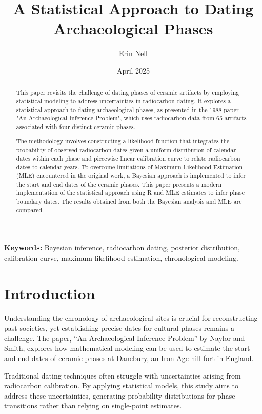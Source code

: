 \documentclass{article}
\title{A Statistical Approach to Dating Archaeological Phases}
\author{Erin Nell}
\date{April 2025}
\begin{document}
\maketitle

\begin{abstract}
This paper revisits the challenge of dating phases of ceramic artifacts by employing statistical modeling to address uncertainties in radiocarbon dating. It explores a statistical approach to dating archaeological phases, as presented in the 1988 paper "An Archaeological Inference Problem", which uses radiocarbon data from 65 artifacts associated with four distinct ceramic phases.

The methodology involves constructing a likelihood function that integrates the probability of observed radiocarbon dates given a uniform distribution of calendar dates within each phase and piecewise linear calibration curve to relate radiocarbon dates to calendar years. To overcome limitations of Maximum Likelihood Estimation (MLE) encountered in the original work, a Bayesian approach is implemented to infer the start and end dates of the ceramic phases. This paper presents a modern implementation of the statistical approach using R and MLE estimates to infer phase boundary dates. The results obtained from both the Bayesian analysis and MLE are compared. 




\end{abstract}

\noindent
\textbf{Keywords:} Bayesian inference, radiocarbon dating, posterior distribution, calibration curve, maximum likelihood estimation, chronological modeling.

\section{Introduction}
Understanding the chronology of archaeological sites is crucial for reconstructing past societies, yet establishing precise dates for cultural phases remains a challenge. The paper, ``An Archaeological Inference Problem'' \cite{thepaper} by Naylor and Smith, explores how mathematical modeling can be used to estimate the start and end dates of ceramic phases at Danebury, an Iron Age hill fort in England.

Traditional dating techniques often struggle with uncertainties arising from radiocarbon calibration. By applying statistical models, this study aims to address these uncertainties, generating probability distributions for phase transitions rather than relying on single-point estimates.
\end{document}

